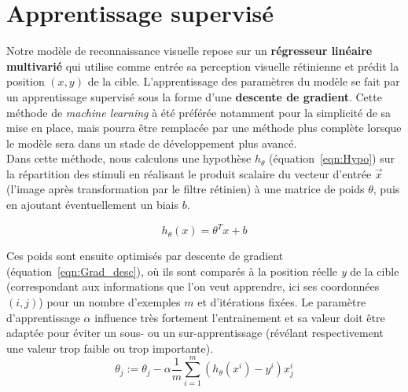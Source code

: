 
\section{Apprentissage supervisé} %

Notre modèle de reconnaissance visuelle repose sur un \textbf{régresseur linéaire multivarié} qui utilise comme entrée sa perception visuelle rétinienne et prédit la position $(x,y)$ de la cible. L'apprentissage des paramètres du modèle se fait par un apprentissage supervisé sous la forme d'une \textbf{descente de gradient}. Cette méthode de \textit{machine learning} à été préférée notamment pour la simplicité de sa mise en place, mais pourra être remplacée par une méthode plus complète lorsque le modèle sera dans un stade de développement plus avancé.\\
Dans cette méthode, nous calculons une hypothèse $h_{\theta}$ (équation~\ref{eqn:Hypo}) sur la répartition des stimuli en réalisant le produit scalaire du vecteur d'entrée $\overrightarrow{x}$ (l'image après transformation par le filtre rétinien) à une matrice de poids $\theta$, puis en ajoutant éventuellement un biais $b$.

\begin{equation}
h_{\theta}(x) = \theta^{T}x + b
\label{eqn:Hypo}
\end{equation}

Ces poids sont ensuite optimisés par descente de gradient (équation~\ref{eqn:Grad_desc}), où ils sont comparés à la position réelle \textit{y} de la cible (correspondant aux informations que l'on veut apprendre, ici ses coordonnées $(i,j)$) pour un nombre d'exemples $m$ et d'itérations fixées. Le paramètre d'apprentissage $\alpha$ influence très fortement l'entrainement et sa valeur doit être adaptée pour éviter un sous- ou un sur-apprentissage (révélant respectivement une valeur trop faible ou trop importante).\\

\begin{equation}
\theta_j := \theta_j - \alpha \frac{1}{m} \sum_{i=1}^m (h_\theta(x^i) - y^i)x_{j}^i
\label{eqn:Grad_desc}
\end{equation}

